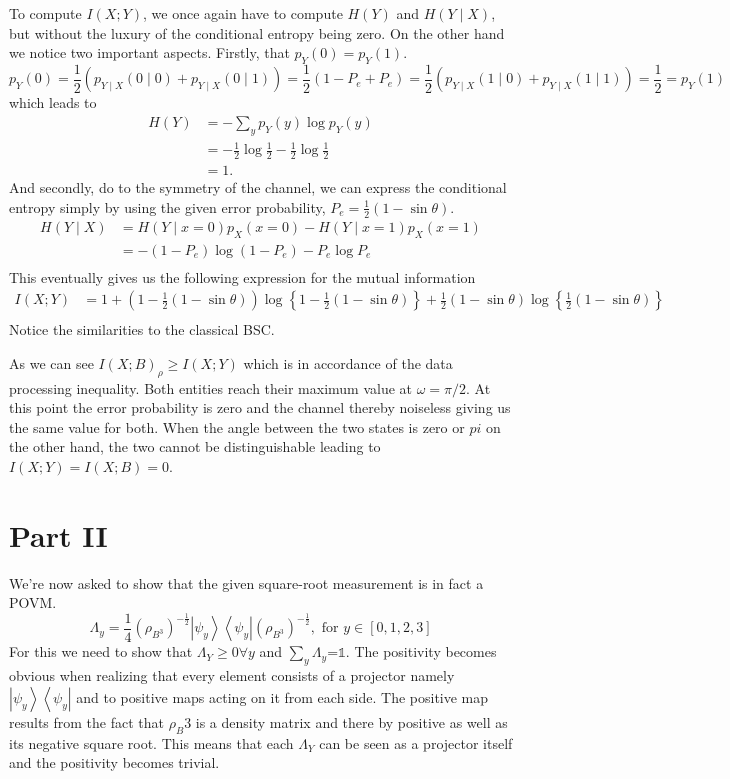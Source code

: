 \documentclass[10]{article}
\begin{document}
To compute $I(X ; Y)$, we once again have to compute $H(Y)$ and $H(Y\mid X)$, but without the luxury of the conditional entropy being zero. On the other hand we notice two important aspects. Firstly, that $p_Y(0) = p_Y(1)$.
$$
p_{Y}(0)=\frac{1}{2}\left(p_{Y \mid X}(0 \mid 0)+p_{Y \mid X}(0 \mid 1)\right)=\frac{1}{2}\left(1-P_{e}+P_{e}\right)=\frac{1}{2}\left(p_{Y \mid X}(1 \mid 0)+p_{Y \mid X}(1 \mid 1)\right)=\frac{1}{2}=p_{Y}(1)
$$
which leads to 
$$
\begin{aligned}
H(Y) &= -\sum_{y} p_{Y}(y) \log p_{Y}(y) \\
& =-\frac{1}{2} \log \frac{1}{2}-\frac{1}{2} \log \frac{1}{2}\\
& =1 .
\end{aligned}
$$
And secondly, do to the symmetry of the channel, we can express the conditional entropy simply by using the given error probability, $P_e = \frac{1}{2}(1-\sin{\theta})$.
$$
\begin{aligned}
H(Y\mid X) &=  H(Y \mid x=0)p_X(x=0)-H(Y \mid x=1)p_X(x=1)\\
& =-\left(1-P_{e}\right) \log \left(1-P_{e}\right)-P_{e} \log P_{e}\\
\end{aligned}
$$
This eventually gives us the following expression for the mutual information 
$$
\begin{aligned}
    I(X ; Y) & = 1+\left(1-\frac{1}{2}(1-\sin \theta)\right) \log \left\{1-\frac{1}{2}(1-\sin \theta)\right\}+\frac{1}{2}(1-\sin \theta) \log \left\{\frac{1}{2}(1-\sin \theta)\right\} \\
\end{aligned}
$$
Notice the similarities to the classical BSC.

As we can see $I(X; B)_\rho \geq I(X ; Y)$ which is in accordance of the data processing inequality. Both entities reach their maximum value at $\omega = \pi/2$. At this point the error probability is zero and the channel thereby noiseless giving us the same value for both. When the angle between the two states is zero or $pi$ on the other hand, the two cannot be distinguishable leading to $I(X ; Y) = I(X; B) = 0$. 


\section*{Part II}
We're now asked to show that the given square-root measurement is in fact a POVM.
$$
\Lambda_{y}=\frac{1}{4}\left(\rho_{B^{3}}\right)^{-\frac{1}{2}}\left|\psi_{y}\right\rangle\left\langle\psi_{y}\right|\left(\rho_{B^{3}}\right)^{-\frac{1}{2}}, \text { for } y \in[0,1,2,3]
$$
For this we need to show that $\Lambda_Y \geq 0 \forall y$ and $\sum_{y} \Lambda_{y}$=\(\mathds{1}\).
The positivity becomes obvious when realizing that every element consists of a projector namely $\left|\psi_{y}\right\rangle\left\langle\psi_{y}\right|$ and to positive maps acting on it from each side. The positive map results from the fact that $\rho_B3$ is a density matrix and there by positive as well as its negative square root. This means that each $\Lambda_Y$ can be seen as a projector itself and the positivity becomes trivial.
\end{document}
